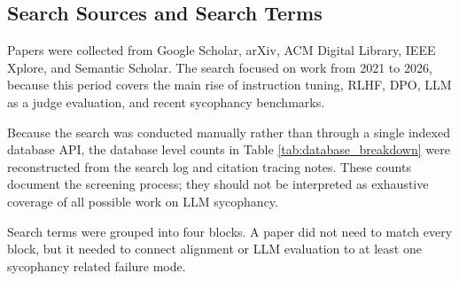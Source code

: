 \documentclass[letterpaper]{article} %
\begin{document}
\subsection{Search Sources and Search Terms}

Papers were collected from Google Scholar, arXiv, ACM Digital Library, IEEE Xplore, and Semantic Scholar. The search focused on work from 2021 to 2026, because this period covers the main rise of instruction tuning, RLHF, DPO, LLM as a judge evaluation, and recent sycophancy benchmarks.

Because the search was conducted manually rather than through a single indexed database API, the database level counts in Table \ref{tab:database_breakdown} were reconstructed from the search log and citation tracing notes. These counts document the screening process; they should not be interpreted as exhaustive coverage of all possible work on LLM sycophancy.

\begin{table}[t]
\centering
\caption{Database level record retrieval before deduplication.}
\label{tab:database_breakdown}
\renewcommand{\arraystretch}{1.15}
\end{table}

Search terms were grouped into four blocks. A paper did not need to match every block, but it needed to connect alignment or LLM evaluation to at least one sycophancy related failure mode.

\begin{table}[t]
\centering
\caption{Search term blocks used for literature retrieval.}
\label{tab:search_terms}
\renewcommand{\arraystretch}{1.15}
\end{table}
\end{document}
